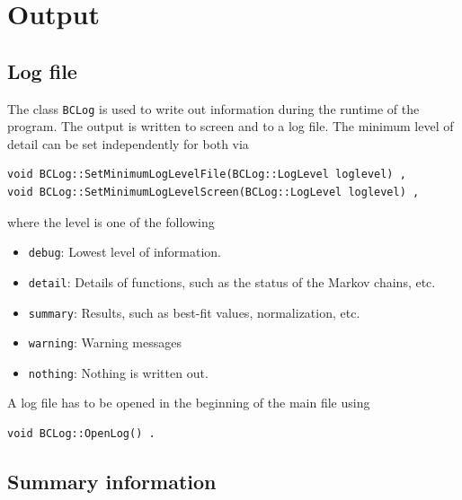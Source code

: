 \documentclass[11pt, a4paper]{article}
\begin{document}

\clearpage
\pagebreak

\section{Output}
\label{section:output}

\subsection{Log file}
\label{subsection:logfile}

The class \verb|BCLog| is used to write out information during the
runtime of the program. The output is written to screen and to a log
file. The minimum level of detail can be set independently for both
via
%
\begin{verbatim}
void BCLog::SetMinimumLogLevelFile(BCLog::LogLevel loglevel) ,
void BCLog::SetMinimumLogLevelScreen(BCLog::LogLevel loglevel) ,
\end{verbatim}
%
\noindent
where the level is one of the following
%
\begin{itemize}
\item \verb|debug|: Lowest level of information.
\item \verb|detail|: Details of functions, such as the status of the
  Markov chains, etc.
\item \verb|summary|: Results, such as best-fit values, normalization, etc.
\item \verb|warning|: Warning messages
\item \verb|nothing|: Nothing is written out.
\end{itemize}

A log file has to be opened in the beginning of the main file using
%
\begin{verbatim}
void BCLog::OpenLog() .
\end{verbatim}


\subsection{Summary information}
\end{document}
